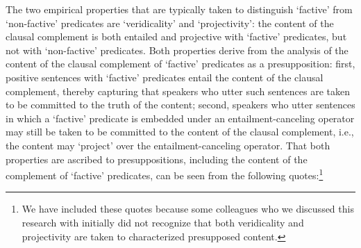 \documentclass[11pt,fleqn]{article}
\newcommand{\6}{\mbox{$[\hspace*{-.6mm}[$}}
\newcommand{\9}{\mbox{$]\hspace*{-.6mm}]$}}
\begin{document}
The two empirical properties that are typically taken to distinguish `factive' from `non-factive' predicates are `veridicality' and `projectivity': the content of the clausal complement is both entailed and projective with `factive' predicates, but not with `non-factive' predicates. Both properties derive  from the analysis of the content of the clausal complement of `factive' predicates as a presupposition: first, positive sentences with `factive' predicates entail the content of the clausal complement, thereby capturing that speakers who utter such sentences are taken to be committed to the truth of the content; second, speakers who utter sentences in which a `factive' predicate is embedded under an entailment-canceling operator may still be taken to be committed to the content of the clausal complement, i.e., the content may `project' over the entailment-canceling operator. That both properties are ascribed to presuppositions, including the content of the complement of `factive' predicates, can be seen from the following quotes:\footnote{We have included these quotes because some colleagues who we discussed this research with initially did not recognize that both veridicality and projectivity are taken to characterized presupposed content.}
\end{document}

